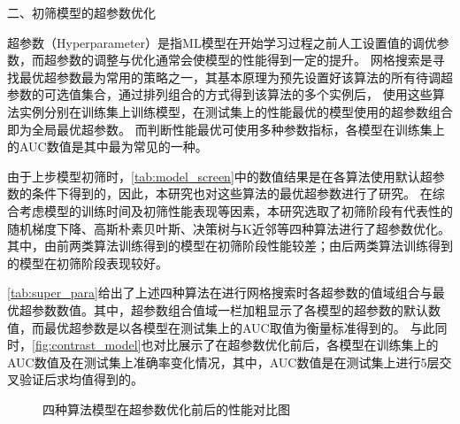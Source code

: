二、初筛模型的超参数优化

超参数（Hyperparameter）是指ML模型在开始学习过程之前人工设置值的调优参数\cite{scikit-learn,Aurélien2018}，而超参数的调整与优化通常会使模型的性能得到一定的提升。
网格搜索是寻找最优超参数最为常用的策略之一，其基本原理为预先设置好该算法的所有待调超参数的可选值集合，通过排列组合的方式得到该算法的多个实例后，
使用这些算法实例分别在训练集上训练模型，在测试集上的性能最优的模型使用的超参数组合即为全局最优超参数\cite{Aurélien2018}。
而判断性能最优可使用多种参数指标，各模型在训练集上的AUC数值是其中最为常见的一种。

由于上步模型初筛时，\autoref{tab:model_screen}中的数值结果是在各算法使用默认超参数的条件下得到的，因此，本研究也对这些算法的最优超参数进行了研究。
在综合考虑模型的训练时间及初筛性能表现等因素，本研究选取了初筛阶段有代表性的随机梯度下降、高斯朴素贝叶斯、决策树与K近邻等四种算法进行了超参数优化。
其中，由前两类算法训练得到的模型在初筛阶段性能较差；由后两类算法训练得到的模型在初筛阶段表现较好。

\autoref{tab:super_para}给出了上述四种算法在进行网格搜索时各超参数的值域组合与最优超参数数值。其中，超参数组合值域一栏加粗显示了各模型的超参数的默认数值，而最优超参数是以各模型在测试集上的AUC取值为衡量标准得到的。
与此同时，\autoref{fig:contrast_model}也对比展示了在超参数优化前后，各模型在训练集上的AUC数值及在测试集上准确率变化情况，其中，AUC数值是在测试集上进行5层交叉验证后求均值得到的。

\begin{figure}[htbp]
    \centering
    \quad
    \caption{\label{fig:contrast_model}四种算法模型在超参数优化前后的性能对比图}
\end{figure}

